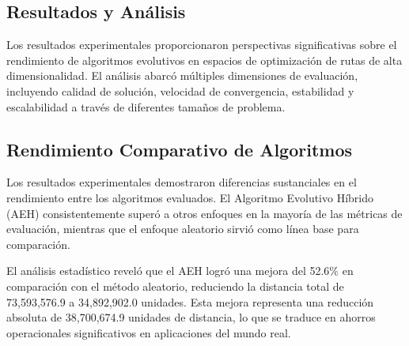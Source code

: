 \documentclass[10pt,a4paper]{article}
\begin{document}
\begin{multicols}{2}
\section{Resultados y Análisis}

Los resultados experimentales proporcionaron perspectivas significativas sobre el rendimiento de algoritmos evolutivos en espacios de optimización de rutas de alta dimensionalidad. El análisis abarcó múltiples dimensiones de evaluación, incluyendo calidad de solución, velocidad de convergencia, estabilidad y escalabilidad a través de diferentes tamaños de problema.

\subsection{Rendimiento Comparativo de Algoritmos}

Los resultados experimentales demostraron diferencias sustanciales en el rendimiento entre los algoritmos evaluados. El Algoritmo Evolutivo Híbrido (AEH) consistentemente superó a otros enfoques en la mayoría de las métricas de evaluación, mientras que el enfoque aleatorio sirvió como línea base para comparación.

\usepackage{graphicx} %
\begin{table}[H]
\centering
\caption{Resultados Comparativos de Rendimiento}
\label{tab:performance_comparison}
\end{table}
El análisis estadístico reveló que el AEH logró una mejora del 52.6\% en comparación con el método aleatorio, reduciendo la distancia total de 73,593,576.9 a 34,892,902.0 unidades. Esta mejora representa una reducción absoluta de 38,700,674.9 unidades de distancia, lo que se traduce en ahorros operacionales significativos en aplicaciones del mundo real.


\end{multicols}
\end{document}
